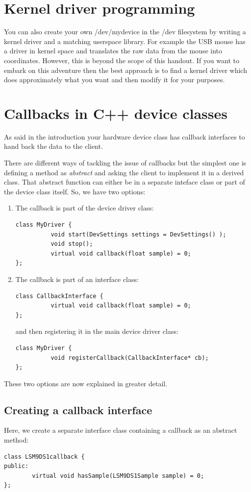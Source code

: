 \documentclass[12pt]{report}
\begin{document}
\section{Kernel driver programming}
You can also create your own /dev/mydevice in the /dev filesystem
by writing a kernel driver and a matching userspace library. For
example the USB mouse has a driver in kernel space and translates
the raw data from the mouse into coordinates. However,
this is beyond the scope of this handout. If you want to embark
on this adventure then the best approach is to
find a kernel driver which does approximately what you want and then
modify it for your purposes.


\section{Callbacks in C++ device classes}
As said in the introduction your hardware device class has callback interfaces
to hand back the data to the client.

There are different ways of tackling the issue of callbacks but the
simplest one is defining a method as \textsl{abstract} and asking the
client to implement it in a derived class. That abstract function can
either be in a separate inteface class or part of the device class
itself. So, we have two options:
\begin{enumerate}
\item The callback is part of the device driver class:
\begin{verbatim}
class MyDriver {
          void start(DevSettings settings = DevSettings() );
          void stop();
          virtual void callback(float sample) = 0;
};
\end{verbatim}
\item The callback is part of an interface class:
\begin{verbatim}
class CallbackInterface {
          virtual void callback(float sample) = 0;
};
\end{verbatim}
and then registering it in the main device driver class:
\begin{verbatim}
class MyDriver {
          void registerCallback(CallbackInterface* cb);
};
\end{verbatim}
\end{enumerate}
These two options are now explained in greater detail.


\subsection{Creating a callback interface}
Here, we create a separate interface class containing a callback
as an abstract method:
\begin{verbatim}
class LSM9DS1callback {
public:
        virtual void hasSample(LSM9DS1Sample sample) = 0;
};
\end{verbatim}
\end{document}
